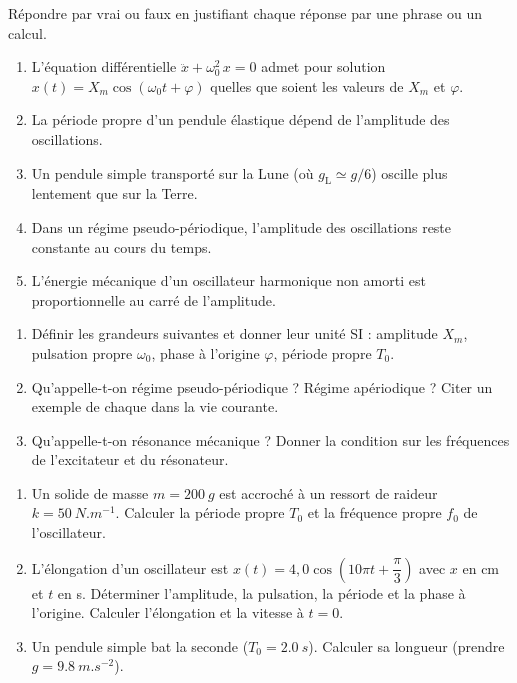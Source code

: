 \documentclass[11pt]{article}
\newcommand{\cle}[1]{{\popxbold\color{popdark}#1}}
\begin{document}
\begin{exercice}
Répondre par vrai ou faux en justifiant chaque réponse par une phrase ou un calcul.
\begin{enumerate}
\item L'équation différentielle $\ddot{x} + \omega_0^2\, x = 0$ admet pour solution $x(t) = X_m\cos(\omega_0 t + \varphi)$ quelles que soient les valeurs de $X_m$ et $\varphi$.
\item La période propre d'un pendule élastique dépend de l'amplitude des oscillations.
\item Un pendule simple transporté sur la Lune (où $g_{\text{L}} \simeq g/6$) oscille plus lentement que sur la Terre.
\item Dans un régime pseudo-périodique, l'amplitude des oscillations reste constante au cours du temps.
\item L'énergie mécanique d'un oscillateur harmonique non amorti est proportionnelle au carré de l'amplitude.
\end{enumerate}
\end{exercice}

\begin{exercice}
\begin{enumerate}
\item Définir les grandeurs suivantes et donner leur unité SI : amplitude $X_m$, pulsation propre $\omega_0$, phase à l'origine $\varphi$, période propre $T_0$.
\item Qu'appelle-t-on \cle{régime pseudo-périodique} ? \cle{Régime apériodique} ? Citer un exemple de chaque dans la vie courante.
\item Qu'appelle-t-on \cle{résonance mécanique} ? Donner la condition sur les fréquences de l'excitateur et du résonateur.
\end{enumerate}
\end{exercice}

\begin{exercice}
\begin{enumerate}
\item Un solide de masse $m = \SI{200}{g}$ est accroché à un ressort de raideur $k = \SI{50}{N.m^{-1}}$. Calculer la période propre $T_0$ et la fréquence propre $f_0$ de l'oscillateur.
\item L'élongation d'un oscillateur est $x(t) = 4,0\cos\left(10\pi t + \dfrac{\pi}{3}\right)$ avec $x$ en cm et $t$ en s. Déterminer l'amplitude, la pulsation, la période et la phase à l'origine. Calculer l'élongation et la vitesse à $t = 0$.
\item Un pendule simple bat la seconde ($T_0 = \SI{2,0}{s}$). Calculer sa longueur (prendre $g = \SI{9,8}{m.s^{-2}}$).
\end{enumerate}
\end{exercice}
\end{document}
